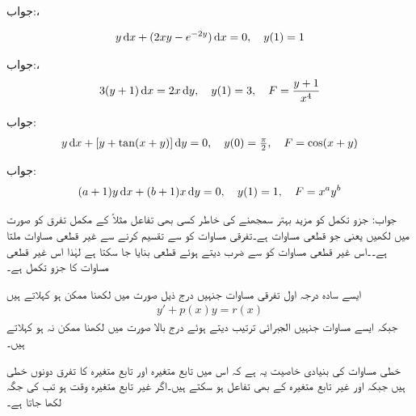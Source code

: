 جواب:، 

\begin{align*}
y\dif x+(2xy-e^{-2y})\dif x=0, \quad y(1)=1
\end{align*}

جواب:، 
\begin{align*}
3(y+1)\dif x=2x\dif y,\quad y(1)=3,\quad F=\frac{y+1}{x^4}
\end{align*}

جواب:
\begin{align*}
y\dif x+[y+\tan(x+y)]\dif y=0,\quad y(0)=\tfrac{\pi}{2},\quad F=\cos(x+y)
\end{align*}

جواب:
\begin{align*}
(a+1)y\dif x+(b+1)x \dif y=0,\quad y(1)=1, \quad F=x^ay^b
\end{align*}

جواب:
جزو تکمل کو مزید بہتر سمجھنے کی خاطر  کسی بھی تفاعل مثلاً  کے مکمل تفرق کو  صورت میں لکھیں یعنی
  جو قطعی مساوات ہے۔تفرقی مساوات کو  سے تقسیم کرنے سے غیر قطعی مساوات 
 ملتا ہے۔۔اس غیر قطعی مساوات کو  سے ضرب دیتے ہوئے قطعی بنایا جا سکتا ہے لہٰذا  اس غیر قطعی مساوات کا جزو تکمل ہے۔

ایسے سادہ درجہ اول تفرقی مساوات جنہیں درج ذیل صورت میں لکھنا ممکن ہو  کہلاتے ہیں
\begin{align}\label{مساوات_سادہ_اول_خطی}
y'+p(x)y=r(x)
\end{align}
جبکہ ایسے مساوات جنہیں الجبرائی ترتیب دیتے ہوئے درج بالا صورت میں لکھنا ممکن نہ ہو  کہلاتے ہیں۔

خطی مساوات  کی بنیادی خاصیت یہ ہے کہ اس میں تابع متغیرہ  اور تابع متغیرہ کا تفرق  دونوں خطی ہیں جبکہ  اور  غیر تابع متغیرہ  کے  بھی تفاعل ہو سکتے ہیں۔اگر غیر تابع متغیرہ وقت ہو تب  کی جگہ  لکھا جاتا ہے۔

